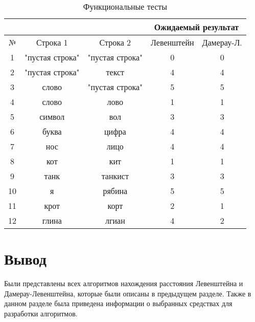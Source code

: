 \begin{table}[h]
	\begin{center}
		\begin{threeparttable}
			\captionsetup{justification=raggedright,singlelinecheck=off}
			\caption{\label{tbl:functional_test} Функциональные тесты}
			\begin{tabular}{|c|c|c|c|c|}
				\hline
				& & & \multicolumn{2}{c|}{Ожидаемый результат} \\
				\hline
				№&Строка 1&Строка 2&Левенштейн&Дамерау-Л. \\
				\hline
				1&"пустая строка"&"пустая строка"&0&0 \\
				\hline
				2&"пустая строка"&текст&4&4 \\
				\hline
				3&слово&"пустая строка"&5&5 \\
				\hline
				4&слово&лово&1&1 \\
				\hline
				5&символ&вол&3&3 \\
				\hline
				6&буква&цифра&4&4 \\
				\hline
				7&нос&лицо&4&4 \\
				\hline
				8&кот&кит&1&1 \\
				\hline
				9&танк&танкист&3&3 \\
				\hline
				10&я&рябина&5&5 \\
				\hline
				11&крот&корт&2&1 \\
				\hline
				12&глина&лгиан&4&2 \\
				\hline
			\end{tabular}
		\end{threeparttable}
	\end{center}
\end{table}

\section{Вывод}

Были представлены всех алгоритмов нахождения расстояния Левенштейна и Дамерау-Левенштейна, которые были описаны в предыдущем разделе. Также в данном разделе была приведена информации о выбранных средствах для разработки алгоритмов.
